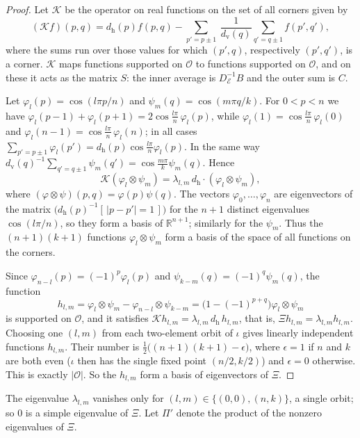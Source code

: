 \documentclass[11pt,a4paper]{amsart}
\theoremstyle{remark}
\newcommand{\dvv}{d_{\mathrm v}}
\newcommand{\dhh}{d_{\mathrm h}}
\begin{document}
\begin{proof}
Let $\mathcal K$ be the operator on real functions on the set of all corners given by
\[ (\mathcal Kf)(p,q)=\dhh(p)f(p,q)-\sum_{p'=p\pm1}\ \frac{1}{\dvv(q)}\sum_{q'=q\pm1}f(p',q'), \]
where the sums run over those values for which $(p',q)$, respectively $(p',q')$, is a corner. $\mathcal K$ maps
functions supported on $\mathcal O$ to functions supported on $\mathcal O$, and on these it acts as the matrix
$S$: the inner average is $D_{\mathcal E}^{-1}B$ and the outer sum is $C$.

Let $\varphi_l(p)=\cos(l\pi p/n)$ and $\psi_m(q)=\cos(m\pi q/k)$. For $0<p<n$ we have
$\varphi_l(p-1)+\varphi_l(p+1)=2\cos\frac{l\pi}n\,\varphi_l(p)$, while
$\varphi_l(1)=\cos\frac{l\pi}n\,\varphi_l(0)$ and $\varphi_l(n-1)=\cos\frac{l\pi}n\,\varphi_l(n)$; in all cases
$\sum_{p'=p\pm1}\varphi_l(p')=\dhh(p)\cos\frac{l\pi}n\varphi_l(p)$. In the same way
$\dvv(q)^{-1}\sum_{q'=q\pm1}\psi_m(q')=\cos\frac{m\pi}{k}\psi_m(q)$. Hence
\[ \mathcal K(\varphi_l\otimes\psi_m)=\lambda_{l,m}\,\dhh\cdot(\varphi_l\otimes\psi_m), \]
where $(\varphi\otimes\psi)(p,q)=\varphi(p)\psi(q)$. The vectors $\varphi_0,\dots,\varphi_n$ are eigenvectors of
the matrix $\bigl(\dhh(p)^{-1}[\,|p-p'|=1\,]\bigr)$ for the $n+1$ distinct eigenvalues $\cos(l\pi/n)$, so they form
a basis of $\mathbb R^{n+1}$; similarly for the $\psi_m$. Thus the $(n+1)(k+1)$ functions
$\varphi_l\otimes\psi_m$ form a basis of the space of all functions on the corners.

Since $\varphi_{n-l}(p)=(-1)^p\varphi_l(p)$ and $\psi_{k-m}(q)=(-1)^q\psi_m(q)$, the function
\[ h_{l,m}=\varphi_l\otimes\psi_m-\varphi_{n-l}\otimes\psi_{k-m}=\bigl(1-(-1)^{p+q}\bigr)\varphi_l\otimes\psi_m \]
is supported on $\mathcal O$, and it satisfies $\mathcal K h_{l,m}=\lambda_{l,m}\,\dhh\, h_{l,m}$, that is,
$\Xi h_{l,m}=\lambda_{l,m}h_{l,m}$. Choosing one $(l,m)$ from each two-element orbit of $\iota$ gives linearly
independent functions $h_{l,m}$. Their number is $\tfrac12\bigl((n+1)(k+1)-\epsilon\bigr)$, where $\epsilon=1$ if
$n$ and $k$ are both even ($\iota$ then has the single fixed point $(n/2,k/2)$) and $\epsilon=0$ otherwise. This is
exactly $|\mathcal O|$. So the $h_{l,m}$ form a basis of eigenvectors of $\Xi$.
\end{proof}

The eigenvalue $\lambda_{l,m}$ vanishes only for $(l,m)\in\{(0,0),(n,k)\}$, a single orbit; so $0$ is a simple
eigenvalue of $\Xi$. Let $\Pi'$ denote the product of the nonzero eigenvalues of $\Xi$.
\end{document}
